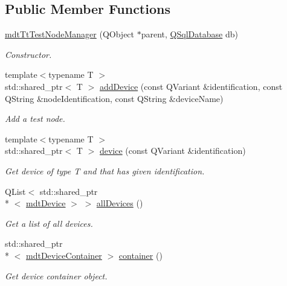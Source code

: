 \subsection*{Public Member Functions}
\begin{DoxyCompactItemize}
\item 
\hyperlink{classmdt_tt_test_node_manager_ae272a2ede47ed1bf5df446acaade76de}{mdt\-Tt\-Test\-Node\-Manager} (Q\-Object $\ast$parent, \hyperlink{class_q_sql_database}{Q\-Sql\-Database} db)
\begin{DoxyCompactList}\small\item\em Constructor. \end{DoxyCompactList}\item 
{\footnotesize template$<$typename T $>$ }\\std\-::shared\-\_\-ptr$<$ T $>$ \hyperlink{classmdt_tt_test_node_manager_a4453ed9d1121e81b808885a62aba7bdc}{add\-Device} (const Q\-Variant \&identification, const Q\-String \&node\-Identification, const Q\-String \&device\-Name)
\begin{DoxyCompactList}\small\item\em Add a test node. \end{DoxyCompactList}\item 
{\footnotesize template$<$typename T $>$ }\\std\-::shared\-\_\-ptr$<$ T $>$ \hyperlink{classmdt_tt_test_node_manager_a7b167f9dbc72611aba52fabf4fe0d40f}{device} (const Q\-Variant \&identification)
\begin{DoxyCompactList}\small\item\em Get device of type T and that has given identification. \end{DoxyCompactList}\item 
Q\-List$<$ std\-::shared\-\_\-ptr\\*
$<$ \hyperlink{classmdt_device}{mdt\-Device} $>$ $>$ \hyperlink{classmdt_tt_test_node_manager_ad5996a8b72cf186de386818239243c2a}{all\-Devices} ()
\begin{DoxyCompactList}\small\item\em Get a list of all devices. \end{DoxyCompactList}\item 
std\-::shared\-\_\-ptr\\*
$<$ \hyperlink{classmdt_device_container}{mdt\-Device\-Container} $>$ \hyperlink{classmdt_tt_test_node_manager_aba5f78564b6ef04a748fbb02d43d18cd}{container} ()
\begin{DoxyCompactList}\small\item\em Get device container object. \end{DoxyCompactList}\item 

\end{DoxyCompactItemize}
